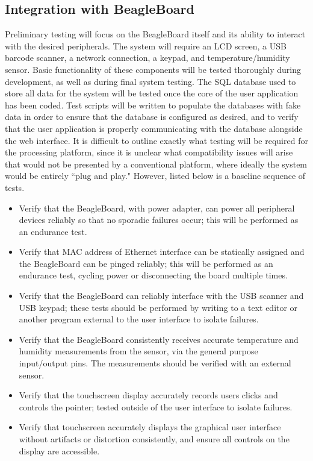 \documentclass[11pt]{article} %
\begin{document}
\subsection{Integration with BeagleBoard}
Preliminary testing will focus on the BeagleBoard itself and its ability to interact with the desired peripherals.  The system will require an LCD screen, a USB barcode scanner, a network connection, a keypad, and temperature/humidity sensor.  Basic functionality of these components will be tested thoroughly during development, as well as during final system testing. 
\newline \quad \newline
The SQL database used to store all data for the system will be tested once the core of the user application has been coded.  Test scripts will be written to populate the databases with fake data in order to ensure that the database is configured as desired, and to verify that the user application is properly communicating with the database alongside the web interface.
\newline \quad \newline
It is difficult to outline exactly what testing will be required for the processing platform, since it is unclear what compatibility issues will arise that would not be presented by a conventional platform, where ideally the system would be entirely ``plug and play." However, listed below is a baseline sequence of tests.
\begin{itemize}
\item Verify that the BeagleBoard, with power adapter, can power all peripheral devices reliably so that no sporadic failures occur; this will be performed as an endurance test.
\item Verify that MAC address of Ethernet interface can be statically assigned and the BeagleBoard can be pinged reliably; this will be performed as an endurance test, cycling power or disconnecting the board multiple times.
\item Verify that the BeagleBoard can reliably interface with the USB scanner and USB keypad; these tests should be performed by writing to a text editor or another program external to the user interface to isolate failures.
\item Verify that the BeagleBoard consistently receives accurate temperature and humidity measurements from the sensor, via the general purpose input/output pins. The measurements should be verified with an external sensor.
\item Verify that the touchscreen display accurately records users clicks and controls the pointer; tested outside of the user interface to isolate failures.
\item Verify that touchscreen accurately displays the graphical user interface without artifacts or distortion consistently, and ensure all controls on the display are accessible.
\end{itemize}
\end{document}
